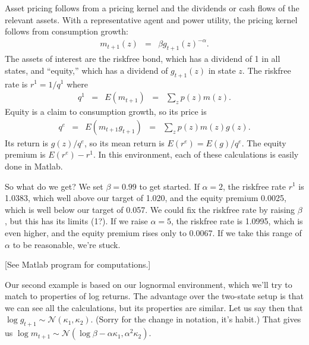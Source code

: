 \documentclass[11pt]{article}
\begin{document}
Asset pricing follows from a pricing kernel and the dividends or cash flows
of the relevant assets.
With a representative agent and power utility, the pricing kernel follows
from consumption growth:
\begin{eqnarray*}
    m_{t+1} (z) &=& \beta g_{t+1}(z)^{-\alpha} .
\end{eqnarray*}
The assets of interest are the riskfree bond, which has a dividend of 1 in all states,
and ``equity,'' which has a dividend of $g_{t+1}(z)$ in state $z$.
The riskfree rate is $r^1 = 1/q^1$ where
\begin{eqnarray*}
    q^1 &=& E (m_{t+1} )  \;\;=\;\; \sum_z p(z) m(z) .
\end{eqnarray*}
Equity is a claim to consumption growth, so its price is
\begin{eqnarray*}
    q^e &=& E (m_{t+1} g_{t+1} )  \;\;=\;\; \sum_z p(z) m(z) g(z) .
\end{eqnarray*}
Its return is $ g(z)/q^e$, so its mean return is $E(r^e) = E (g)/q^e$.
The equity premium is $ E(r^e) - r^1$.
In this environment, each of these calculations is easily done in Matlab.

So what do we get?
We set $\beta = 0.99$ to get started.
If $\alpha = 2$, the riskfree rate $r^1$ is 1.0383, which well above our target of 1.020,
and the equity premium 0.0025, which is well below our target of 0.057.
We could fix the riskfree rate by raising $\beta$,
but this has its limits (1?).
If we raise $\alpha = 5$, the riskfree rate is 1.0995,
which is even higher,
and the equity premium rises only to 0.0067.
If we take this range of $\alpha$ to be reasonable, we're stuck.

[See Matlab program for computations.]


Our second example is based on our lognormal environment,
which we'll try to match to properties of log returns.
The advantage over the two-state setup is that we can see all the calculations,
but its properties are similar.
Let us say then that $\log g_{t+1} \sim \mathcal{N}(\kappa_1, \kappa_2)$.
(Sorry for the change in notation, it's habit.)
That gives us
$\log m_{t+1} \sim \mathcal{N}(\log \beta - \alpha \kappa_1, \alpha^2 \kappa_2)$.
\end{document}
